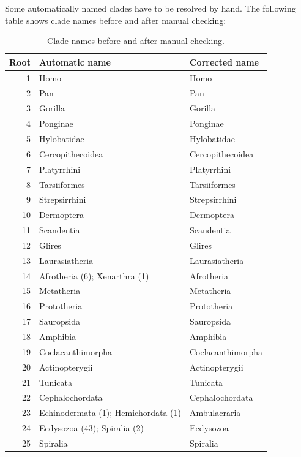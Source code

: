 Some automatically named clades have to be resolved by hand. The
following table shows clade names before and after manual checking:

\begin{table}[H]

\caption{\label{tab:unnamed-chunk-6}Clade names before and after manual checking.}
\begin{tabular}[t]{rll}
\toprule
Root & Automatic name & Corrected name\\
\midrule
\rowcolor{gray!6}  1 & Homo & Homo\\
2 & Pan & Pan\\
\rowcolor{gray!6}  3 & Gorilla & Gorilla\\
4 & Ponginae & Ponginae\\
\rowcolor{gray!6}  5 & Hylobatidae & Hylobatidae\\
6 & Cercopithecoidea & Cercopithecoidea\\
\rowcolor{gray!6}  7 & Platyrrhini & Platyrrhini\\
8 & Tarsiiformes & Tarsiiformes\\
\rowcolor{gray!6}  9 & Strepsirrhini & Strepsirrhini\\
10 & Dermoptera & Dermoptera\\
\rowcolor{gray!6}  11 & Scandentia & Scandentia\\
12 & Glires & Glires\\
\rowcolor{gray!6}  13 & Laurasiatheria & Laurasiatheria\\
14 & Afrotheria (6); Xenarthra (1) & Afrotheria\\
\rowcolor{gray!6}  15 & Metatheria & Metatheria\\
16 & Prototheria & Prototheria\\
\rowcolor{gray!6}  17 & Sauropsida & Sauropsida\\
18 & Amphibia & Amphibia\\
\rowcolor{gray!6}  19 & Coelacanthimorpha & Coelacanthimorpha\\
20 & Actinopterygii & Actinopterygii\\
\rowcolor{gray!6}  21 & Tunicata & Tunicata\\
22 & Cephalochordata & Cephalochordata\\
\rowcolor{gray!6}  23 & Echinodermata (1); Hemichordata (1) & Ambulacraria\\
24 & Ecdysozoa (43); Spiralia (2) & Ecdysozoa\\
\rowcolor{gray!6}  25 & Spiralia & Spiralia\\

\end{tabular}
\end{table}
